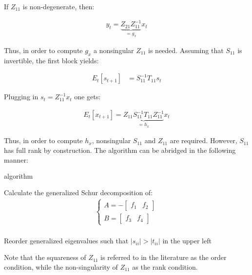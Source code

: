 \documentclass{pracamgr}
\numberwithin{equation}{section}
\begin{document}
If $Z_{11}$ is non-degenerate, then:

\begin{align}
  y_t = \underbrace{Z_{21} Z_{11}^{-1}}_{=g_x} x_t
\end{align}

Thus, in order to compute $g_x$ a nonsingular $Z_{11}$ is needed. Assuming  that $S_{11}$ is invertible, the first block yields:

\begin{align}
   E_t[s_{t+1}] &= S_{11}^{-1} T_{11} s_t
\end{align}

Plugging in $s_t = Z_{11}^{-1} x_t$ one gets:

\begin{align}
   E_t[ x_{t+1}] = \underbrace{Z_{11} S_{11}^{-1} T_{11} Z_{11}^{-1}}_{=h_x} x_t
\end{align}

Thus, in order to compute $h_x$, nonsingular $S_{11}$ and $Z_{11}$ are required. However, $S_{11}$ has full rank by construction. The \citet{klein2000using} algorithm can be abridged in the following manner: \\

\begin{algorithm}[H]
\caption{\citet{klein2000using} algorithm}
Calculate the generalized Schur decomposition of: \\
\qquad \begin{align*} \begin{cases}
A=-\begin{bmatrix} f_1 & f_2\end{bmatrix} \\
B=\begin{bmatrix} f_3 & f_4\end{bmatrix}
\end{cases} \end{align*} \\
Reorder generalized eigenvalues such that $|s_{ii}|>|t_{ii}|$ in the upper left\;
\end{algorithm}

\bigbreak

Note that the squareness of $Z_{11}$ is referred to in the literature as the \citet{blanchard1980solution} order condition, while the non-singularity of $Z_{11}$ as the \citet{blanchard1980solution} rank condition.
\end{document}
